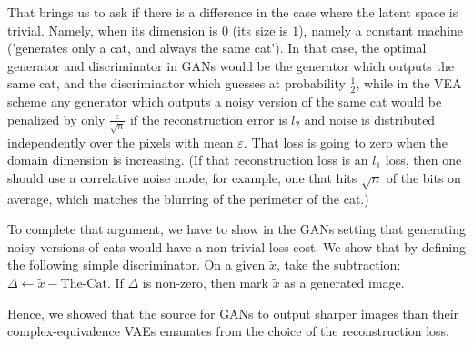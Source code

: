 \documentclass{article}
\begin{document}
That brings us to ask if there is a difference in the case where the latent space is trivial. Namely, when its dimension is $0$ (its size is $1$), namely a constant machine ('generates only a cat, and always the same cat'). In that case, the optimal generator and discriminator in GANs would be the generator which outputs the same cat, and the discriminator which guesses at probability $\frac{1}{2}$, while in the VEA scheme any generator which outputs a noisy version of the same cat would be penalized by only $\frac{\varepsilon}{\sqrt{n}}$ if the reconstruction error is $l_2$ and noise is distributed independently over the pixels with mean $\varepsilon$. That loss is going to zero when the domain dimension is increasing. (If that reconstruction loss is an $l_{1}$ loss, then one should use a correlative noise mode, for example, one that hits $\sqrt{n}$ of the bits on average, which matches the blurring of the perimeter of the cat.)

To complete that argument, we have to show in the GANs setting that generating noisy versions of cats would have a non-trivial loss cost. We show that by defining the following simple discriminator. On a given $\tilde{x}$, take the subtraction: $\Delta \leftarrow \tilde{x} - \text{The-Cat}$. If $\Delta$ is non-zero, then mark $\tilde{x}$ as a generated image.

Hence, we showed that the source for GANs to output sharper images than their complex-equivalence VAEs emanates from the choice of the reconstruction loss.


\end{document}
